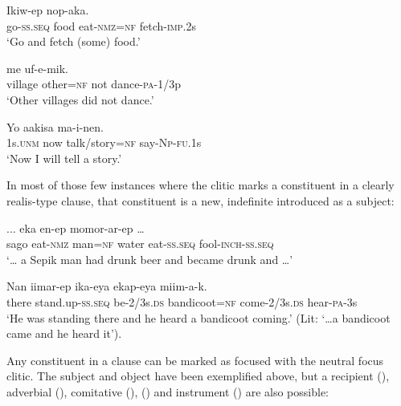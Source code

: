 \ea%
\label{ex:x1720}
\gll Ikiw-ep     nop-aka.\\
go-\textsc{ss}.\textsc{seq}  food  eat-\textsc{nmz}=\textsc{nf}  fetch-\textsc{imp}.2s\\
\glt`Go and fetch (some) food.'
\z


\ea%
\label{ex:x1721}
\gll {}    me  uf-e-mik. \\
village  other=\textsc{nf}  not  dance-\textsc{pa}-1/3p      \\
\glt`Other villages did not dance.'
\z


\ea%
\label{ex:x1722}
\gll Yo  aakisa    ma-i-nen. \\
1s.\textsc{unm}  now  talk/story=\textsc{nf}  say-\textsc{Np}-\textsc{fu}.1s      \\
\glt`Now I will tell a story.'
\z


In most of those few instances where the  clitic marks a constituent in a clearly realis-type clause, that constituent is a new, indefinite  introduced as a subject:

\ea%
\label{ex:x1733}
\gll ...    eka  en-ep  momor-ar-ep  {\dots} \\
sago  eat-\textsc{nmz}  man=\textsc{nf}  water  eat-\textsc{ss}.\textsc{seq}  fool-\textsc{inch}-\textsc{ss}.\textsc{seq}\\
\glt`{\dots} a Sepik man had drunk beer and became drunk and {\dots}'
\z


\ea%
\label{ex:x1732}
\gll Nan  iimar-ep  ika-eya    ekap-eya miim-a-k.\\
there  stand.up-\textsc{ss}.\textsc{seq}  be-2/3s.\textsc{ds}  bandicoot=\textsc{nf}  come-2/3s.\textsc{ds} hear-\textsc{pa}-3s     \\
\glt`He was standing there and he heard a bandicoot coming.' (Lit: `{\dots}a bandicoot came and he heard it').
\z


Any constituent in a clause can be marked as focused with the neutral focus clitic. The subject and object have been exemplified above, but a recipient (), adverbial (), comitative (), () and instrument () are also possible:

